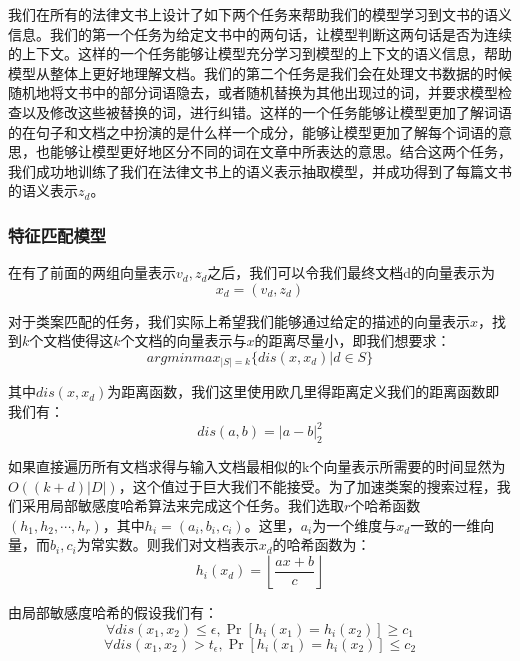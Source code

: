 我们在所有的法律文书上设计了如下两个任务来帮助我们的模型学习到文书的语义信息。我们的第一个任务为给定文书中的两句话，让模型判断这两句话是否为连续的上下文。这样的一个任务能够让模型充分学习到模型的上下文的语义信息，帮助模型从整体上更好地理解文档。我们的第二个任务是我们会在处理文书数据的时候随机地将文书中的部分词语隐去，或者随机替换为其他出现过的词，并要求模型检查以及修改这些被替换的词，进行纠错。这样的一个任务能够让模型更加了解词语的在句子和文档之中扮演的是什么样一个成分，能够让模型更加了解每个词语的意思，也能够让模型更好地区分不同的词在文章中所表达的意思。结合这两个任务，我们成功地训练了我们在法律文书上的语义表示抽取模型，并成功得到了每篇文书的语义表示$z_{d}$。

\subsubsection{特征匹配模型}
在有了前面的两组向量表示$v_d,z_d$之后，我们可以令我们最终文档d的向量表示为
	\begin{equation}
		x_{d}=(v_{d}, z_{d})
	\end{equation}

对于类案匹配的任务，我们实际上希望我们能够通过给定的描述的向量表示$x$，找到$k$个文档使得这$k$个文档的向量表示与$x$的距离尽量小，即我们想要求：
	\begin{equation}
		arg⁡min⁡ max_{|S|=k}⁡\{dis(x,x_{d})|d \in S\}  
	\end{equation}

其中$dis(x,x_d)$为距离函数，我们这里使用欧几里得距离定义我们的距离函数即我们有：
	\begin{equation}
		dis(a,b)=|a-b|_{2}^{2}
	\end{equation}

如果直接遍历所有文档求得与输入文档最相似的k个向量表示所需要的时间显然为$O((k+d)|D|)$，这个值过于巨大我们不能接受。为了加速类案的搜索过程，我们采用局部敏感度哈希算法来完成这个任务。我们选取$r$个哈希函数$(h_1,h_2,⋯,h_r)$，其中$h_i=(a_i,b_i,c_i)$。这里，$a_i$为一个维度与$x_d$一致的一维向量，而$b_i,c_i$为常实数。则我们对文档表示$x_d$的哈希函数为：
	\begin{equation}
		h_{i}(x_{d}) = \left\lfloor \frac{ax+b}{c} \right\rfloor
	\end{equation}
	
由局部敏感度哈希的假设我们有：
	\begin{equation}
		\forall dis(x_{1},x_{2} ) \leq \epsilon, \Pr⁡[h_{i}(x_{1}) = h_{i}(x_{2})] \geq c_1
	\end{equation}
	\begin{equation}
		\forall dis(x_{1},x_{2} ) > t_\epsilon, \Pr⁡[h_{i}(x_{1}) = h_{i}(x_{2})] \leq c_2
	\end{equation}

